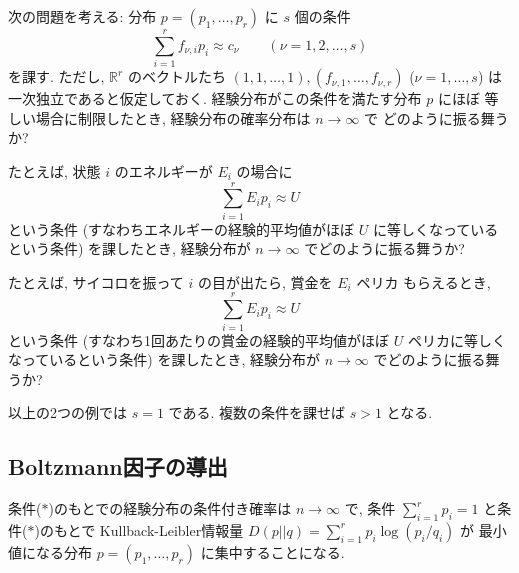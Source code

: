 \documentclass[12pt,twoside]{jarticle}
\newcommand\R{{\mathbb R}} %
\theoremstyle{jplain}
\theoremstyle{jplain}
\theoremstyle{jplain}
\numberwithin{theorem}{section}
\numberwithin{equation}{section}
\numberwithin{figure}{section}
\numberwithin{table}{section}
\begin{document}
次の問題を考える: 分布 $p=(p_1,\ldots,p_r)$ に $s$ 個の条件
\[
\sum_{i=1}^r f_{\nu,i}p_i \approx c_\nu
\qquad (\nu=1,2,\ldots,s)
\tag{$*$}
\]
を課す. 
ただし, $\R^r$ のベクトルたち $(1,1,\ldots,1),(f_{\nu,1},\ldots,f_{\nu,r})$ 
($\nu=1,\ldots,s$) は一次独立であると仮定しておく.
経験分布がこの条件を満たす分布 $p$ にほぼ
等しい場合に制限したとき, 経験分布の確率分布は $n\to\infty$ で
どのように振る舞うか?

たとえば, 状態 $i$ のエネルギーが $E_i$ の場合に
\[
\sum_{i=1}^r E_i p_i \approx U
\]
という条件
(すなわちエネルギーの経験的平均値がほぼ $U$ に等しくなっているという条件)
を課したとき, 経験分布が $n\to\infty$ でどのように振る舞うか?

たとえば, サイコロを振って $i$ の目が出たら, 賞金を $E_i$ ペリカ
もらえるとき,
\[
\sum_{i=1}^r E_i p_i \approx U
\]
という条件
(すなわち1回あたりの賞金の経験的平均値がほぼ $U$ ペリカに等しくなっているという条件)
を課したとき, 経験分布が $n\to\infty$ でどのように振る舞うか?

以上の2つの例では $s=1$ である.  複数の条件を課せば $s>1$ となる.


\subsection{Boltzmann因子の導出}

条件($*$)のもとでの経験分布の条件付き確率は $n\to\infty$ で, 
条件 $\sum_{i=1}^r p_i=1$ と条件($*$)のもとで
Kullback-Leibler情報量 $D(p||q)=\sum_{i=1}^r p_i\log(p_i/q_i)$ が
最小値になる分布 $p=(p_1,\ldots,p_r)$ に集中することになる.
\end{document}
